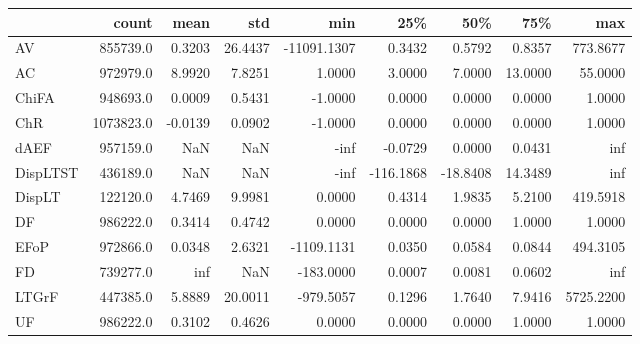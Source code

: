 \begin{tabular}{lrrrrrrrr}
\toprule
{} &      count &    mean &      std &         min &       25\% &      50\% &      75\% &        max \\
\midrule
AV       &   855739.0 &  0.3203 &  26.4437 & -11091.1307 &    0.3432 &   0.5792 &   0.8357 &   773.8677 \\
AC       &   972979.0 &  8.9920 &   7.8251 &      1.0000 &    3.0000 &   7.0000 &  13.0000 &    55.0000 \\
ChiFA    &   948693.0 &  0.0009 &   0.5431 &     -1.0000 &    0.0000 &   0.0000 &   0.0000 &     1.0000 \\
ChR      &  1073823.0 & -0.0139 &   0.0902 &     -1.0000 &    0.0000 &   0.0000 &   0.0000 &     1.0000 \\
dAEF     &   957159.0 &     NaN &      NaN &        -inf &   -0.0729 &   0.0000 &   0.0431 &        inf \\
DispLTST &   436189.0 &     NaN &      NaN &        -inf & -116.1868 & -18.8408 &  14.3489 &        inf \\
DispLT   &   122120.0 &  4.7469 &   9.9981 &      0.0000 &    0.4314 &   1.9835 &   5.2100 &   419.5918 \\
DF       &   986222.0 &  0.3414 &   0.4742 &      0.0000 &    0.0000 &   0.0000 &   1.0000 &     1.0000 \\
EFoP     &   972866.0 &  0.0348 &   2.6321 &  -1109.1131 &    0.0350 &   0.0584 &   0.0844 &   494.3105 \\
FD       &   739277.0 &     inf &      NaN &   -183.0000 &    0.0007 &   0.0081 &   0.0602 &        inf \\
LTGrF    &   447385.0 &  5.8889 &  20.0011 &   -979.5057 &    0.1296 &   1.7640 &   7.9416 &  5725.2200 \\
UF       &   986222.0 &  0.3102 &   0.4626 &      0.0000 &    0.0000 &   0.0000 &   1.0000 &     1.0000 \\
\bottomrule
\end{tabular}

